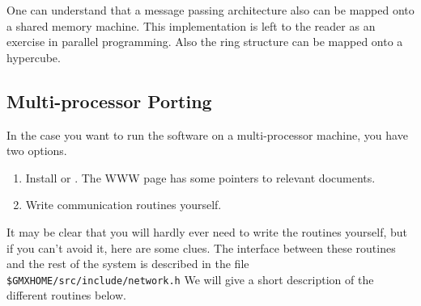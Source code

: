 One can understand that a message passing architecture also can be
mapped onto a shared memory machine. This implementation is left to
the reader as an exercise in parallel programming. Also the ring
structure can be mapped onto {\eg} a hypercube.

\subsection{Multi-processor Porting}

In the case you want to run the {\gromacs} software on a
multi-processor machine, you have two options.
\begin{enumerate}
\item	Install  or . The {\gromacs} WWW
	page has some pointers to relevant documents.
\item	Write communication routines yourself. 
\end{enumerate}

It may be clear that you will hardly ever need to write the routines
yourself, but if you can't avoid it, here are some clues.
The interface between these routines and the
rest of the {\gromacs} system is described in the file {\tt
\$GMXHOME/src/include/network.h} We will give a short description of the
different routines below.

